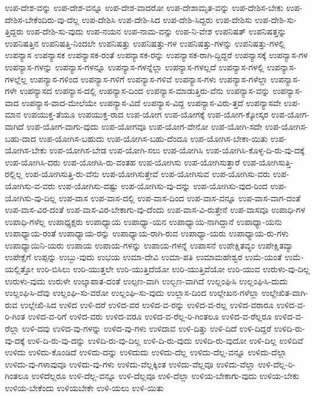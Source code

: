{ಉಪ-ದೇಶ-ವನ್ನು
ಉಪ-ದೇಶ-ವನ್ನೂ
ಉಪ-ದೇಶ-ವಾದರೋ
ಉಪ-ದೇಶಾಮೃತ-ವನ್ನು
ಉಪ-ದೇಶಿಸ-ಬೇಕು
ಉಪ-ದೇಶಿಸ-ಬೇಕೆಂದಿರು-ವು-ದೆಲ್ಲ
ಉಪ-ದೇಶಿಸಿ
ಉಪ-ದೇಶಿ-ಸಿದ
ಉಪ-ದೇಶಿ-ಸಿದ್ದರು
ಉಪ-ದೇಶಿಸು
ಉಪ-ದೇಶಿ-ಸು-ತ್ತಿದ್ದರು
ಉಪ-ದೇಶಿ-ಸು-ವುದು
ಉಪ-ನಯನ
ಉಪ-ನಾಮ-ವನ್ನು
ಉಪ-ನಿ-ವೇಶ
ಉಪನಿಷತ್
ಉಪನಿಷತ್ತನ್ನು
ಉಪನಿಷತ್ತಿನ
ಉಪನಿಷತ್ತಿ-ನಿಂದಲೇ
ಉಪನಿಷತ್ತು
ಉಪನಿಷತ್ತು-ಗಳ
ಉಪನಿಷತ್ತು-ಗಳನ್ನು
ಉಪನಿಷತ್ತು-ಗಳಲ್ಲಿ
ಉಪನ್ಯಾಸ
ಉಪನ್ಯಾಸಕ
ಉಪನ್ಯಾಸಕ-ರಂತೆ
ಉಪನ್ಯಾಸಕ-ರನ್ನು
ಉಪನ್ಯಾಸಕ-ರಾಗಿ-ದ್ದಿದ್ದರೆ
ಉಪನ್ಯಾಸಕ್ಕೆ
ಉಪನ್ಯಾಸ-ಗಳ
ಉಪನ್ಯಾಸ-ಗಳನ್ನು
ಉಪನ್ಯಾಸ-ಗಳನ್ನೂ
ಉಪನ್ಯಾಸ-ಗಳನ್ನೆಲ್ಲಾ
ಉಪನ್ಯಾಸ-ಗಳಲ್ಲದೆ
ಉಪನ್ಯಾಸ-ಗಳಲ್ಲಿ
ಉಪನ್ಯಾಸ-ಗಳಲ್ಲೆಲ್ಲ
ಉಪನ್ಯಾಸ-ಗಳಿಂದ
ಉಪನ್ಯಾಸ-ಗಳಿಗೆ
ಉಪನ್ಯಾಸ-ಗಳಿವೆ
ಉಪನ್ಯಾಸ-ಗಳು
ಉಪನ್ಯಾಸ-ಗಳೆಲ್ಲಾ
ಉಪನ್ಯಾಸ-ಗಳೇ
ಉಪನ್ಯಾಸದ
ಉಪನ್ಯಾಸ-ದಲ್ಲಿ
ಉಪನ್ಯಾಸ-ದಿಂದ
ಉಪನ್ಯಾಸ-ಮಾಡುತ್ತಿರು-ವೆನು
ಉಪನ್ಯಾಸ-ವನ್ನು
ಉಪನ್ಯಾಸ-ವಾದ
ಉಪನ್ಯಾಸ-ವಾದ-ಮೇಲೆಯೇ
ಉಪನ್ಯಾಸ-ವಿದೆ
ಉಪನ್ಯಾಸ-ವಿದ್ದ
ಉಪನ್ಯಾಸ-ವಿರು-ತ್ತದೆ
ಉಪನ್ಯಾಸವೇ
ಉಪ-ಮಾನ
ಉಪಯುಕ್ತ-ತೆಯೂ
ಉಪಯುಕ್ತ-ರಾದ
ಉಪ-ಯೋಗ
ಉಪ-ಯೋಗಕ್ಕೆ
ಉಪ-ಯೋಗ-ಕ್ಕೋಸ್ಕರ
ಉಪ-ಯೋಗ-ವಾಗಿದೆ
ಉಪ-ಯೋಗ-ವಾಗು-ವುದು
ಉಪ-ಯೋಗವೂ
ಉಪ-ಯೋಗ-ವೇನೋ
ಉಪ-ಯೋಗಿ-ಸದೇ
ಉಪ-ಯೋಗಿಸ-ಬಹು-ದಾದ
ಉಪ-ಯೋಗಿಸ-ಬಹುದು
ಉಪ-ಯೋಗಿಸ-ಬಹು-ದೆಂದೂ
ಉಪ-ಯೋಗಿಸ-ಬೇಕಾ-ಯಿತು
ಉಪ-ಯೋಗಿಸ-ಬೇಕು
ಉಪ-ಯೋಗಿಸ-ಬೇಡ
ಉಪ-ಯೋಗಿ-ಸಲು
ಉಪ-ಯೋಗಿಸಿ
ಉಪ-ಯೋಗಿಸಿ-ಕೊಳ್ಳ-ದಿ-ರು-ವು-ದಕ್ಕೆ
ಉಪ-ಯೋಗಿಸಿ-ದರು
ಉಪ-ಯೋಗಿಸಿ-ರು-ವಂತಹ
ಉಪ-ಯೋಗಿಸು
ಉಪ-ಯೋಗಿಸುತ್ತಾರೆ
ಉಪ-ಯೋಗಿಸುತ್ತಿ-ರಲ್ಲಿಲ್ಲ
ಉಪ-ಯೋಗಿಸುತ್ತಿ-ರು-ವೆನು
ಉಪ-ಯೋಗಿಸುತ್ತೇವೆ
ಉಪ-ಯೋಗಿಸುವ
ಉಪ-ಯೋಗಿಸು-ವರು
ಉಪ-ಯೋಗಿಸು-ವ-ವರು
ಉಪ-ಯೋಗಿಸು-ವಷ್ಟು
ಉಪ-ಯೋಗಿಸು-ವು-ದನ್ನು
ಉಪ-ಯೋಗಿಸು-ವುದ-ರಿಂದ
ಉಪ-ಯೋಗಿಸು-ವು-ದಿಲ್ಲ
ಉಪ-ವಾಸ
ಉಪ-ವಾಸ-ದಲ್ಲಿ
ಉಪ-ವಾಸ-ದಿಂದ
ಉಪ-ವಾಸ-ವನ್ನೂ
ಉಪ-ವಾಸ-ವಾಗ-ದಂತೆ
ಉಪ-ವಾಸ-ವಿರ-ದಂತೆ
ಉಪ-ವಾಸ-ವಿರ-ಬೇಕಾಗು-ವು-ದೆಂದು
ಉಪ-ವಾಸ-ವಿ-ರುತ್ತೇನೆ
ಉಪ-ವಾಸವೂ
ಉಪಾಧಿ-ಗಳ
ಉಪಾಧಿ-ಗಳೆಲ್ಲ
ಉಪಾಧ್ಯಕ್ಷರು
ಉಪಾಧ್ಯಾಯ
ಉಪಾಧ್ಯಾ-ಯನ
ಉಪಾಧ್ಯಾಯ-ನಾಗಿದ್ದಾನೆ
ಉಪಾಧ್ಯಾ-ಯನು
ಉಪಾಧ್ಯಾಯ-ರಂತೆ
ಉಪಾಧ್ಯಾಯ-ರನ್ನು
ಉಪಾಧ್ಯಾಯ-ರಾಗಿ-ರುವ
ಉಪಾಧ್ಯಾ-ಯರು
ಉಪಾಧ್ಯಾಯ-ರು-ಗಳು
ಉಪಾಧ್ಯಾಯಿನಿ-ಯರು
ಉಪಾಯ
ಉಪಾಯ-ಗಳನ್ನು
ಉಪಾಯ-ಗಳನ್ನೆ
ಉಪಾಸನೆ
ಉಪೇಕ್ಷಿತವ್ಯಂ
ಉಪೇಕ್ಷಿತವ್ಯಾ
ಉಪೇಕ್ಷೆಗೆ
ಉಪ್ಪನ್ನು
ಉಬ್ಬು-ವುದು
ಉಭಯ
ಉಮಾ-ದೇವಿ
ಉಮಾ-ಪತಿ
ಉಮಾಮಹೇಶ್ವರ
ಉಮೆ-ಯಂತೆ
ಉಮೆ-ಯಲ್ಲಿತ್ತೋ
ಉರಿ-ಬಿಸಿಲು
ಉರಿ-ಯುತ್ತಲೇ
ಉರಿ-ಯುತ್ತಿದೆಯೋ
ಉರಿ-ಯುತ್ತಿವೆಯೋ
ಉರಿ-ಯುವ
ಉರುಳು-ವು-ದಿಲ್ಲ
ಉರುಳು-ವುದು
ಉರುಳೇ
ಉಲ್ಕಾಪಾತ-ದಂತೆ
ಉಲ್ಪಣ-ವಾಗಿ
ಉಲ್ಬಣ-ವಾಗಿದೆ
ಉಲ್ಲಂಘಿಸಿ
ಉಲ್ಲಂಘಿಸಿ-ದುದು
ಉಲ್ಲಂಘಿಸಿ-ದೆವು
ಉಲ್ಲಂಘಿ-ಸು-ವರೋ
ಉಲ್ಲಂಘಿ-ಸು-ವುದು
ಉಲ್ಲಾಸ-ದಿಂದ
ಉಲ್ಲೇಖನ-ಗಳೆಲ್ಲಾ
ಉಲ್ಲೇಖಿತ-ವಾಗಿ-ರುವ
ಉಲ್ಲೇಖಿ-ಸಿದ
ಉಳಿದ
ಉಳಿ-ದರೆ
ಉಳಿದ-ವರ
ಉಳಿದ-ವ-ರನ್ನು
ಉಳಿದ-ವ-ರಲ್ಲ
ಉಳಿದ-ವರಾರೂ
ಉಳಿದ-ವ-ರಿ-ಗಿಂತ
ಉಳಿದ-ವ-ರಿಗೆ
ಉಳಿದ-ವರು
ಉಳಿದ-ವರೂ
ಉಳಿದ-ವ-ರೆಲ್ಲ-ರಿ-ಗಿಂತಲೂ
ಉಳಿದ-ವ-ರೆಲ್ಲರೂ
ಉಳಿದ-ವ-ರೆಲ್ಲಾ
ಉಳಿ-ದವು
ಉಳಿದ-ವು-ಗಳನ್ನು
ಉಳಿದ-ವು-ಗಳು
ಉಳಿದಾವ
ಉಳಿ-ದಿತ್ತು
ಉಳಿ-ದಿದೆ
ಉಳಿ-ದಿದ್ದರೆ
ಉಳಿದಿ-ರು-ವು-ದಕ್ಕೆ
ಉಳಿ-ದಿ-ರು-ವು-ದನ್ನು
ಉಳಿದಿ-ರು-ವು-ದಿಲ್ಲ
ಉಳಿ-ದಿ-ರು-ವುದು
ಉಳಿದಿ-ರು-ವುದೋ
ಉಳಿ-ದಿಲ್ಲ
ಉಳಿದಿವೆ
ಉಳಿದು
ಉಳಿದು-ಕೊಂಡಿದೆ
ಉಳಿದು-ದನ್ನು
ಉಳಿದುದು
ಉಳಿದು-ದೆಲ್ಲ
ಉಳಿದು-ದೆಲ್ಲ-ವನ್ನೂ
ಉಳಿದು-ದೆಲ್ಲಾ
ಉಳಿದು-ವು-ಗಳಾವುವೂ
ಉಳಿದು-ವು-ಗಳು
ಉಳಿದು-ವೆಲ್ಲಕ್ಕಿಂತ
ಉಳಿದು-ವೆಲ್ಲವೂ
ಉಳಿದು-ವೆಲ್ಲಾ
ಉಳಿ-ದೆಲ್ಲ-ರಿ-ಗಿಂತಲೂ
ಉಳಿದೆಲ್ಲರೂ
ಉಳಿ-ದೆಲ್ಲ-ವನ್ನೂ
ಉಳಿ-ದೆಲ್ಲವೂ
ಉಳಿ-ದೆಲ್ಲಾ
ಉಳಿಯ-ಬೇಕಾಗು-ವುದು
ಉಳಿಯ-ಬೇಕು
ಉಳಿಯ-ಬೇಕೆಂದು
ಉಳಿಯಬೇಕೇ
ಉಳಿ-ಯಲು
ಉಳಿ-ಯಿತು
}
